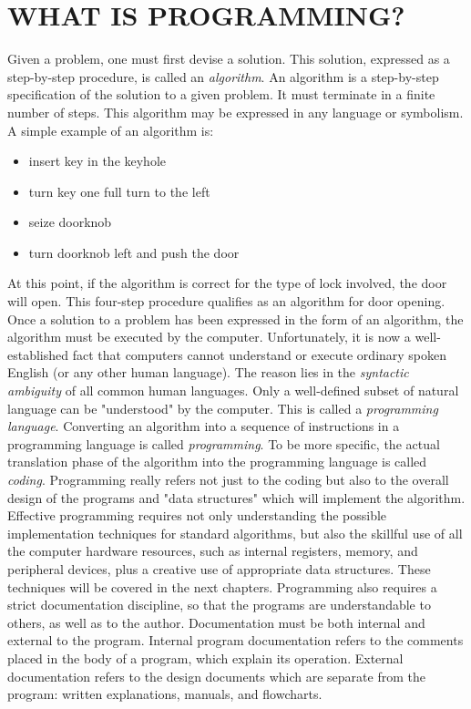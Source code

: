 \section*{WHAT IS PROGRAMMING?}

Given a problem, one must first devise a solution. This solution,
expressed as a step-by-step procedure, is called an \textit{algorithm}. An
algorithm is a step-by-step specification of the solution to a given
problem. It must terminate in a finite number of steps. This
algorithm may be expressed in any language or symbolism. A simple example of an algorithm is:

\begin{itemize}
\item{insert key in the keyhole}
\item{turn key one full turn to the left}
\item{seize doorknob}
\item{turn doorknob left and push the door}
\end{itemize}

At this point, if the algorithm is correct for the type of lock involved, the door will open. This four-step procedure qualifies as an algorithm for door opening.
Once a solution to a problem has been expressed in the form of an algorithm, the algorithm must be executed by the computer.
Unfortunately, it is now a well-established fact that computers cannot understand or execute ordinary spoken English (or any other human language). The reason lies in the \textit{syntactic ambiguity} of all common human languages. Only a well-defined subset of natural language can be "understood" by the computer. This is called a \textit{programming language}.
Converting an algorithm into a sequence of instructions in a programming language is called \textit{programming}. To be more specific, the actual translation phase of the algorithm into the programming language is called \textit{coding}. Programming really refers not just to the coding but also to the overall design of the programs and "data structures" which will implement the algorithm.
Effective programming requires not only understanding the possible implementation techniques for standard algorithms, but also the skillful use of all the computer hardware resources, such as internal registers, memory, and peripheral devices, plus a creative use of appropriate data structures. These techniques will be covered in the next chapters.
Programming also requires a strict documentation discipline, so that the programs are understandable to others, as well as to the author. Documentation must be both internal and external to the program.
Internal program documentation refers to the comments placed in the body of a program, which explain its operation.
External documentation refers to the design documents which are separate from the program: written explanations, manuals, and flowcharts.

